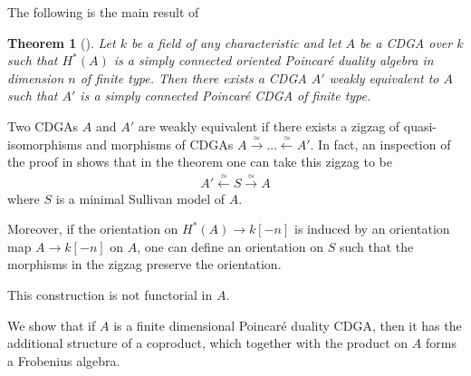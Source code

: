 \documentclass{scrartcl}
\theoremstyle{plain}
\newtheorem{theorem}{Theorem}[section]
\theoremstyle{definition}
\renewcommand{\epsilon}{\varepsilon}
\renewcommand{\subset}{\subseteq}
\newcommand{\quiso}{\simeq}
\let\xto\xrightarrow
\let\xfrom\xleftarrow
\begin{document}
The following is the main result of 
\begin{theorem}[\cite{lambrechts2008poincare}]\label{thm:lambrechts-stanley-model}
    Let $k$ be a field of any characteristic and let $A$ be a CDGA over $k$ such that $H^*(A)$ is a simply connected oriented Poincaré duality algebra in dimension $n$ of finite type. Then there exists a CDGA $A'$ weakly equivalent to $A$ such that $A'$ is a simply connected Poincaré CDGA of finite type.
\end{theorem}
Two CDGAs $A$ and $A'$ are weakly equivalent if there exists a zigzag of quasi-isomorphisms and morphisms of CDGAs $A\xto{\quiso} \dots\xfrom{\quiso} A'$. In fact, an inspection of the proof in \cite{lambrechts2008poincare} shows that in the theorem one can take this zigzag to be
\begin{align*}
    A' \xfrom{\quiso} S\xto{\quiso} A
\end{align*}
where $S$ is a minimal Sullivan model of $A$. 

Moreover, if the orientation on $H^*(A)\to k[-n]$ is induced by an orientation map $A\to k[-n]$ on $A$, one can define an orientation on $S$ such that the morphisms in the zigzag preserve the orientation.

This construction is not functorial in $A$.


We show that if $A$ is a finite dimensional Poincaré duality CDGA, then it has the additional structure of a coproduct, which together with the product on $A$ forms a Frobenius algebra. 
\end{document}
